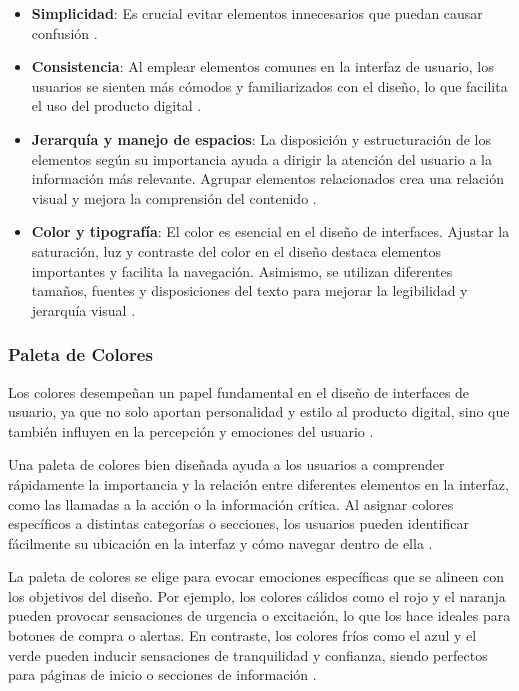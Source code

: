 \begin{itemize}
    \item \textbf{Simplicidad}: Es crucial evitar elementos innecesarios que puedan causar confusión \cite{AnonimoUX}.
    \item \textbf{Consistencia}: Al emplear elementos comunes en la interfaz de usuario, los usuarios se sienten más cómodos y familiarizados con el diseño, lo que facilita el uso del producto digital \cite{AnonimoUX}.
    \item \textbf{Jerarquía y manejo de espacios}: La disposición y estructuración de los elementos según su importancia ayuda a dirigir la atención del usuario a la información más relevante. Agrupar elementos relacionados crea una relación visual y mejora la comprensión del contenido \cite{AnonimoUX}.
    \item \textbf{Color y tipografía}: El color es esencial en el diseño de interfaces. Ajustar la saturación, luz y contraste del color en el diseño destaca elementos importantes y facilita la navegación. Asimismo, se utilizan diferentes tamaños, fuentes y disposiciones del texto para mejorar la legibilidad y jerarquía visual \cite{AnonimoUX}.
\end{itemize}

\subsubsection{Paleta de Colores}
Los colores desempeñan un papel fundamental en el diseño de interfaces de usuario, ya que no solo aportan personalidad y estilo al producto digital, sino que también influyen en la percepción y emociones del usuario \cite{EspacioUXSF}.

Una paleta de colores bien diseñada ayuda a los usuarios a comprender rápidamente la importancia y la relación entre diferentes elementos en la interfaz, como las llamadas a la acción o la información crítica. Al asignar colores específicos a distintas categorías o secciones, los usuarios pueden identificar fácilmente su ubicación en la interfaz y cómo navegar dentro de ella \cite{EspacioUXSF}.

La paleta de colores se elige para evocar emociones específicas que se alineen con los objetivos del diseño. Por ejemplo, los colores cálidos como el rojo y el naranja pueden provocar sensaciones de urgencia o excitación, lo que los hace ideales para botones de compra o alertas. En contraste, los colores fríos como el azul y el verde pueden inducir sensaciones de tranquilidad y confianza, siendo perfectos para páginas de inicio o secciones de información \cite{EspacioUXSF}.

